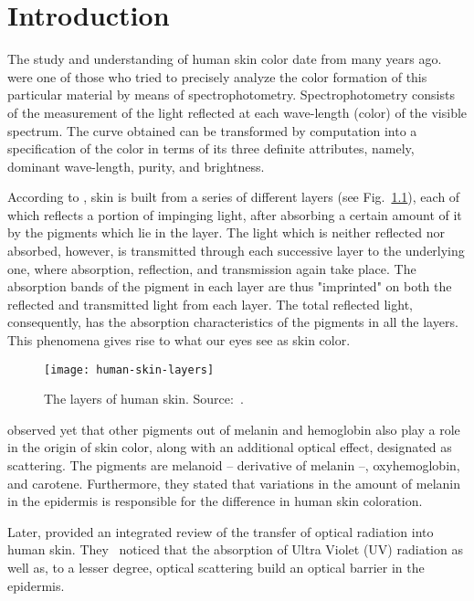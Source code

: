 \chapter{Introduction}
\label{cap:introducao}
The study and understanding of human skin color date from many years ago. \citet{edwards:39} were one of those who tried to precisely analyze the color formation of this particular material by means of spectrophotometry. Spectrophotometry consists of the measurement of the light reflected at each wave-length (color) of the visible spectrum. The curve obtained can be transformed by computation into a specification of the color in terms of its three definite attributes, namely, dominant wave-length, purity, and brightness.

According to \citet{edwards:39}, skin is built from a series of different layers (see Fig.~\ref{fig:human-skin-layers}), each of which reflects a portion of impinging light, after absorbing a certain amount of it by the pigments which lie in the layer. The light which is neither reflected nor absorbed, however, is transmitted through each successive layer to the underlying one, where absorption, reflection, and transmission again take place. The absorption bands of the pigment in each layer are thus "imprinted" on both the reflected and transmitted light from each layer. The total reflected light, consequently, has the absorption characteristics of the pigments in all the layers. This phenomena gives rise to what our eyes see as skin color.

\begin{figure}[!hb]
  \centering
  \texttt{[image: human-skin-layers]}
  \caption[The layers of human skin]{The layers of human skin. Source:~\citet{nanette:18}.}
  \label{fig:human-skin-layers}
\end{figure}

\citet{edwards:39} observed yet that other pigments out of melanin and hemoglobin also play a role in the origin of skin color, along with an additional optical effect, designated as scattering. The pigments are melanoid -- derivative of melanin --, oxyhemoglobin, and carotene. Furthermore, they stated that variations in the amount of melanin in the epidermis is responsible for the difference in human skin coloration.

Later, \citet{anderson:81} provided an integrated review of the transfer of optical radiation into human skin. They~\citep{anderson:81} noticed that the absorption of Ultra Violet (UV) radiation as well as, to a lesser degree, optical scattering build an optical barrier in the epidermis.

